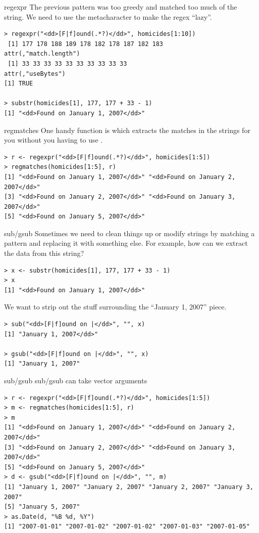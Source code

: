 \documentclass[aspectratio=169]{beamer}
\begin{document}
\begin{frame}[fragile]{regexpr}
The previous pattern was too greedy and matched too much of the
string. We need to use the  metacharacter to make the regex
``lazy''.
\begin{verbatim}
> regexpr("<dd>[F|f]ound(.*?)</dd>", homicides[1:10])
 [1] 177 178 188 189 178 182 178 187 182 183
attr(,"match.length")
 [1] 33 33 33 33 33 33 33 33 33 33
attr(,"useBytes")
[1] TRUE

> substr(homicides[1], 177, 177 + 33 - 1)
[1] "<dd>Found on January 1, 2007</dd>"

\end{verbatim}
\end{frame}

\begin{frame}[fragile]{regmatches}
One handy function is  which extracts the matches in
the strings for you without you having to use .
\begin{verbatim}
> r <- regexpr("<dd>[F|f]ound(.*?)</dd>", homicides[1:5])
> regmatches(homicides[1:5], r)
[1] "<dd>Found on January 1, 2007</dd>" "<dd>Found on January 2, 2007</dd>"
[3] "<dd>Found on January 2, 2007</dd>" "<dd>Found on January 3, 2007</dd>"
[5] "<dd>Found on January 5, 2007</dd>"
\end{verbatim}
\end{frame}

\begin{frame}[fragile]{sub/gsub}
Sometimes we need to clean things up or modify strings by matching a
pattern and replacing it with something else. For example, how can we
extract the data from this string?
\begin{verbatim}
> x <- substr(homicides[1], 177, 177 + 33 - 1)
> x
[1] "<dd>Found on January 1, 2007</dd>"
\end{verbatim}
We want to strip out the stuff surrounding the ``January 1, 2007''
piece.
\begin{verbatim}
> sub("<dd>[F|f]ound on |</dd>", "", x)
[1] "January 1, 2007</dd>"

> gsub("<dd>[F|f]ound on |</dd>", "", x)
[1] "January 1, 2007"
\end{verbatim}
\end{frame}


\begin{frame}[fragile]{sub/gsub}
sub/gsub can take vector arguments
\begin{verbatim}
> r <- regexpr("<dd>[F|f]ound(.*?)</dd>", homicides[1:5])
> m <- regmatches(homicides[1:5], r)
> m
[1] "<dd>Found on January 1, 2007</dd>" "<dd>Found on January 2, 2007</dd>"
[3] "<dd>Found on January 2, 2007</dd>" "<dd>Found on January 3, 2007</dd>"
[5] "<dd>Found on January 5, 2007</dd>"
> d <- gsub("<dd>[F|f]ound on |</dd>", "", m)
[1] "January 1, 2007" "January 2, 2007" "January 2, 2007" "January 3, 2007"
[5] "January 5, 2007"
> as.Date(d, "%B %d, %Y")
[1] "2007-01-01" "2007-01-02" "2007-01-02" "2007-01-03" "2007-01-05"
\end{verbatim}
\end{frame}
\end{document}
